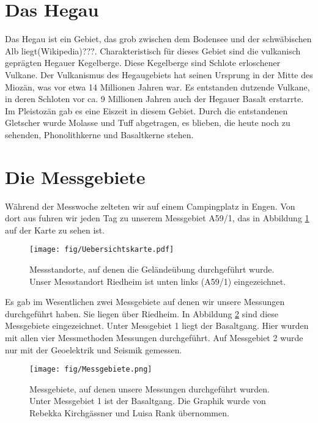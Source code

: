 \section{Das Hegau}

Das Hegau ist ein Gebiet, das grob zwischen dem Bodensee und der schwäbischen Alb liegt(Wikipedia)???. Charakteristisch für dieses Gebiet sind die vulkanisch 
geprägten Hegauer Kegelberge. Diese Kegelberge sind Schlote erloschener Vulkane. Der Vulkanismus des Hegaugebiets hat seinen Ursprung in der Mitte des Miozän, 
was vor etwa 14 Millionen Jahren war. Es entstanden dutzende Vulkane, in deren Schloten vor ca. 9 Millionen Jahren auch der Hegauer Basalt erstarrte.
Im Pleistozän gab es eine Eiszeit in diesem Gebiet. Durch die entstandenen Gletscher wurde Molasse und Tuff abgetragen, es blieben, die heute noch zu sehenden, 
Phonolithkerne und Basaltkerne stehen. 

\section{Die Messgebiete}
\label{sec:Messgebiete}

Während der Messwoche zelteten wir auf einem Campingplatz in Engen. Von dort aus fuhren wir jeden Tag zu unserem Messgebiet A59/1, das in Abbildung \ref{abb:Messgebietegro} auf der Karte zu sehen ist.

\begin{figure}[ht]
 \centering
 \texttt{[image: fig/Uebersichtskarte.pdf]}
 \caption[Messstandorte]{Messstandorte, auf denen die Geländeübung durchgeführt wurde. Unser Messstandort Riedheim ist unten links (A59/1) eingezeichnet.}
 \label{abb:Messgebietegro}
\end{figure}

Es gab im Wesentlichen zwei Messgebiete auf denen wir unsere Messungen durchgeführt haben. Sie liegen über Riedheim. In Abbildung \ref{abb:Messgebiete} sind diese Messgebiete 
eingezeichnet. Unter Messgebiet 1 liegt der Basaltgang. Hier wurden mit allen vier Messmethoden Messungen durchgeführt. 
Auf Messgebiet 2 wurde nur mit der Geoelektrik und Seismik gemessen.

\begin{figure}[ht]
 \centering
 \texttt{[image: fig/Messgebiete.png]}
 \caption[Messgebiete]{Messgebiete, auf denen unsere Messungen durchgeführt wurden. Unter Messgebiet 1 ist der Basaltgang. Die Graphik wurde von Rebekka Kirchgässner und Luisa Rank übernommen.}
 \label{abb:Messgebiete}
\end{figure}

